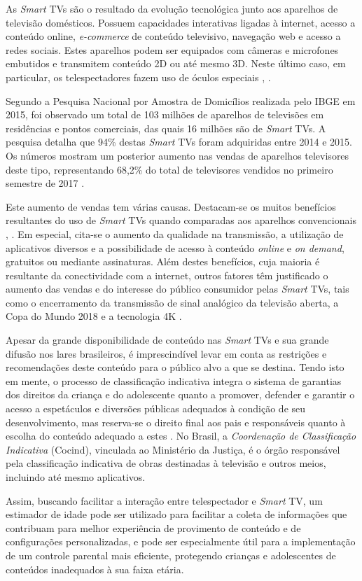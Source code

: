 
As \emph{Smart} TVs são o resultado da evolução tecnológica junto aos aparelhos de televisão domésticos. Possuem capacidades interativas ligadas à internet, acesso a conteúdo online, \emph{e-commerce} de conteúdo televisivo, navegação web e acesso a redes sociais. Estes aparelhos podem ser equipados com câmeras e microfones embutidos e transmitem conteúdo 2D ou até mesmo 3D. Neste último caso, em particular, os telespectadores fazem uso de óculos especiais \cite{samsung:smarttv}, \cite{perakakis2015proposed}.

Segundo a Pesquisa Nacional por Amostra de Domicílios realizada pelo IBGE em 2015, foi observado um total de 103 milhões de aparelhos de televisões em residências e pontos comerciais, das quais 16 milhões são de \emph{Smart} TVs. A pesquisa detalha que 94\% destas \emph{Smart} TVs foram adquiridas entre 2014 e 2015. Os números mostram um posterior aumento nas vendas de aparelhos televisores deste tipo, representando 68,2\% do total de televisores vendidos no primeiro semestre de 2017 \cite{pnad2015}.

Este aumento de vendas tem várias causas. Destacam-se os muitos benefícios resultantes do uso de \emph{Smart} TVs quando comparadas aos aparelhos convencionais \cite{shin2013smart}, \cite{differencebetween}. Em especial, cita-se o aumento da qualidade na transmissão, a utilização de aplicativos diversos e a possibilidade de acesso à conteúdo \emph{online} e \emph{on demand}, gratuitos ou mediante assinaturas. Além destes benefícios, cuja maioria é resultante da conectividade com a internet, outros fatores têm justificado o aumento das vendas e do interesse do público consumidor pelas \emph{Smart} TVs, tais como o encerramento da transmissão de sinal analógico da televisão aberta, a Copa do Mundo 2018 e a tecnologia 4K \cite{leiajabuscasmart,correiopnad,estadao:explosaovideosonline}.

Apesar da grande disponibilidade de conteúdo nas \emph{Smart} TVs e sua grande difusão nos lares brasileiros, é imprescindível levar em conta as restrições e recomendações deste conteúdo para o público alvo a que se destina. Tendo isto em mente, o processo de classificação indicativa integra o sistema de garantias dos direitos da criança e do adolescente quanto a promover, defender e garantir o acesso a espetáculos e diversões públicas adequados à condição de seu desenvolvimento, mas reserva-se o direito final aos pais e responsáveis quanto à escolha do conteúdo adequado a estes \cite{eca}. No Brasil, a \emph{Coordenação de Classificação Indicativa} (Cocind), vinculada ao Ministério da Justiça, é o órgão responsável pela classificação indicativa de obras destinadas à televisão e outros meios, incluindo até mesmo aplicativos.

Assim, buscando facilitar a interação entre telespectador e \emph{Smart} TV, um estimador de idade pode ser utilizado para facilitar a coleta de informações que contribuam para melhor experiência de provimento de conteúdo e de configurações personalizadas, e pode ser especialmente útil para a implementação de um controle parental mais eficiente, protegendo crianças e adolescentes de conteúdos inadequados à sua faixa etária.
